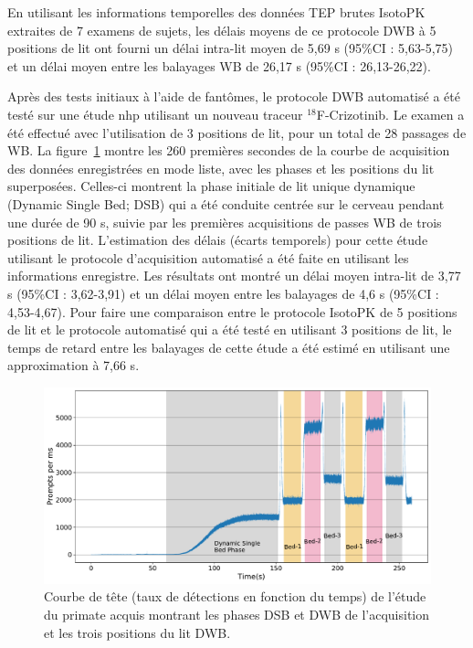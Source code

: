 En utilisant les informations temporelles des données TEP brutes IsotoPK extraites de 7 examens de sujets, les délais moyens de ce protocole DWB à 5 positions de lit ont fourni un délai intra-lit moyen de 5,69 s (95\%CI : 5,63-5,75) et un délai moyen entre les balayages WB de 26,17 s (95\%CI : 26,13-26,22).
 
Après des tests initiaux à l'aide de fantômes, le protocole DWB automatisé a été testé sur une étude \gls{nhp} utilisant un nouveau traceur $^{18}$F-Crizotinib. Le examen a été effectué avec l'utilisation de 3 positions de lit, pour un total de 28 passages de WB.
La figure~\ref{fig3_1:Macaque_Head_Curve_Phases} montre les 260 premières secondes de la courbe de acquisition des données enregistrées en mode liste, avec les phases et les positions du lit superposées. Celles-ci montrent la phase initiale de lit unique dynamique (Dynamic Single Bed; DSB) qui a été conduite centrée sur le cerveau
pendant une durée de 90 s, suivie par les premières acquisitions de passes WB de trois positions de lit.
L'estimation des délais (écarts temporels) pour cette étude utilisant le protocole d'acquisition automatisé a été faite en utilisant les informations enregistre. Les résultats ont montré un délai moyen intra-lit de 3,77 s (95\%CI : 3,62-3,91) et un délai moyen entre les balayages de 4,6 s (95\%CI : 4,53-4,67). 
Pour faire une comparaison entre le protocole IsotoPK de 5 positions de lit et le protocole automatisé qui a été testé en utilisant 3 positions de lit, le temps de retard entre les balayages de cette étude a été estimé en utilisant une approximation à 7,66 s.

\begin{figure} [ht!]
\centering
\includegraphics[scale=0.45,angle=0]{./Resume/3_1_Macaque_Head_curve_Phases.pdf}
\caption{Courbe de tête (taux de détections en fonction du temps) de l'étude du primate acquis montrant les phases DSB et DWB de l'acquisition et les trois positions du lit DWB.}
\label{fig3_1:Macaque_Head_Curve_Phases}
\end{figure}


